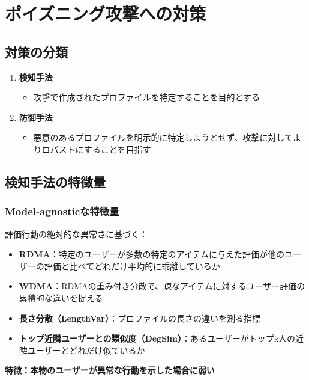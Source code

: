 \documentclass[11pt,a4paper]{article}
\begin{document}
\section{ポイズニング攻撃への対策}

\subsection{対策の分類}
\begin{enumerate}
    \item \textbf{検知手法}
    \begin{itemize}
        \item 攻撃で作成されたプロファイルを特定することを目的とする
    \end{itemize}
    
    \item \textbf{防御手法}
    \begin{itemize}
        \item 悪意のあるプロファイルを明示的に特定しようとせず、攻撃に対してよりロバストにすることを目指す
    \end{itemize}
\end{enumerate}

\subsection{検知手法の特徴量}

\subsubsection{Model-agnosticな特徴量}
評価行動の絶対的な異常さに基づく：
\begin{itemize}
    \item \textbf{RDMA}：特定のユーザーが多数の特定のアイテムに与えた評価が他のユーザーの評価と比べてどれだけ平均的に乖離しているか
    \item \textbf{WDMA}：RDMAの重み付き分散で、疎なアイテムに対するユーザー評価の累積的な違いを捉える
    \item \textbf{長さ分散（LengthVar）}：プロファイルの長さの違いを測る指標
    \item \textbf{トップ近隣ユーザーとの類似度（DegSim）}：あるユーザーがトップk人の近隣ユーザーとどれだけ似ているか
\end{itemize}

\textbf{特徴：本物のユーザーが異常な行動を示した場合に弱い}
\end{document}
